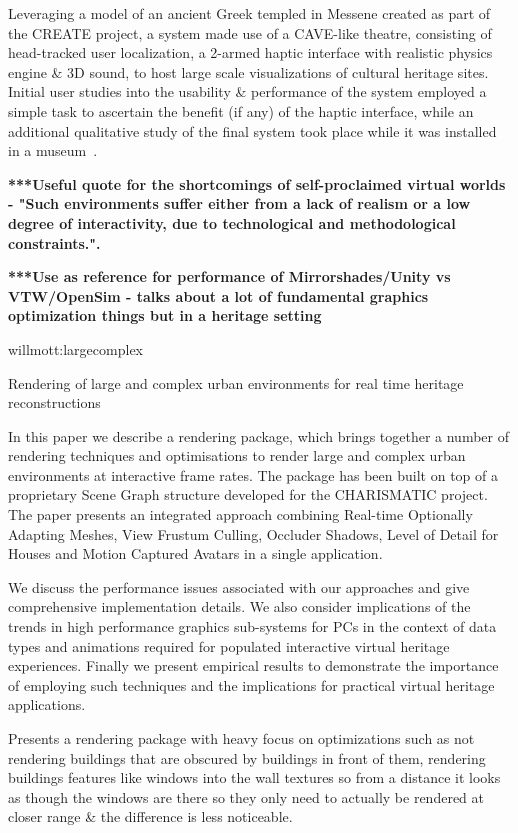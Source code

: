 
Leveraging a model of an ancient Greek templed in Messene created as part of the CREATE project, a system made use of a CAVE-like theatre, consisting of head-tracked user localization, a 2-armed haptic interface with realistic physics engine \& 3D sound, to host large scale visualizations of cultural heritage sites. Initial user studies into the usability \& performance of the system employed a simple task to ascertain the benefit (if any) of the haptic interface, while an additional qualitative study of the final system took place while it was installed in a museum~\cite{Christou2006}.

\textbf{***Useful quote for the shortcomings of self-proclaimed virtual worlds - "Such environments suffer
either from a lack of realism or a low degree of interactivity, due to technological and
methodological constraints.".}


\textbf{***Use as reference for performance of Mirrorshades/Unity vs VTW/OpenSim - talks about a lot of fundamental graphics optimization things but in a heritage setting}

willmott:largecomplex

Rendering of large and complex urban environments for real time heritage reconstructions

In this paper we describe a rendering package, which brings
together a number of rendering techniques and optimisations to
render large and complex urban environments at interactive frame
rates. The package has been built on top of a proprietary Scene
Graph structure developed for the CHARISMATIC project. The
paper presents an integrated approach combining Real-time
Optionally Adapting Meshes, View Frustum Culling, Occluder
Shadows, Level of Detail for Houses and Motion Captured
Avatars in a single application.

We discuss the performance issues associated with our
approaches and give comprehensive implementation details. We
also consider implications of the trends in high performance
graphics sub-systems for PCs in the context of data types and
animations required for populated interactive virtual heritage
experiences. Finally we present empirical results to demonstrate
the importance of employing such techniques and the implications
for practical virtual heritage applications.


Presents a rendering package with heavy focus on optimizations such as not rendering buildings
that are obscured by buildings in front of them, rendering buildings features like windows into
the wall textures so from a distance it looks as though the windows are there so they only need to
actually be rendered at closer range \& the difference is less noticeable.

